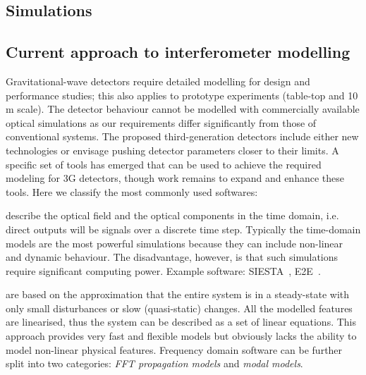 \begin{samepage} %

\section{Simulations}
\subsection{Current approach to interferometer modelling}
Gravitational-wave detectors require detailed modelling for design and performance studies; this also applies 
to prototype experiments (table-top and 10\,m scale). 
The detector behaviour cannot be modelled with commercially available optical simulations as our requirements differ significantly from those of conventional systems. 
The proposed third-generation detectors include either new technologies or envisage pushing detector parameters closer to their limits. 
A specific set of tools has emerged that can be used to achieve the required modeling for 3G detectors, though work remains to expand and enhance these tools. Here we classify the most commonly used softwares:

 describe the optical field and the optical components in the time domain, i.e. direct outputs will be signals over a discrete time step. Typically the time-domain models are the most powerful   simulations because they can include non-linear and dynamic behaviour.
The disadvantage, however, is that such simulations require significant computing power. Example software: SIESTA~\cite{SIESTA}, E2E~\cite{e2e_2000}.


 are based on the approximation that the entire system is in a steady-state with only small disturbances or slow (quasi-static) changes. All the modelled features are linearised, thus the system can be described as a set of linear equations. 
This approach provides very fast and flexible models but obviously lacks the ability to model non-linear physical features. Frequency domain software can be further split into two categories: \emph{FFT propagation models} and \emph{modal models}.

\end{samepage} %

